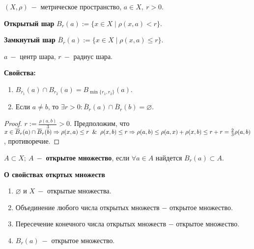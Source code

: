 \begin{definition}
    $(X,\rho)\ -$ метрическое пространство, $a\in X,\ r>0$.

    \textbf{Открытый шар} $B_r(a):=\{x\in X\mid \rho(x,a)<r\}$.

    \textbf{Замкнутый шар} $\overline{B}_r(a):=\{x\in X\mid \rho(x,a)\leq r\}$.

    $a\ -$ центр шара, $r\ -$ радиус шара.
\end{definition}

\begin{statement}
    \textbf{Свойства:}
    \begin{enumerate}
        \item $B_{r_1}(a)\cap B_{r_2}(a)=B_{\min\{r_1, r_2\}}(a)$.
        \item Если $a\neq b$, то $\exists r>0:\overline{B}_r(a)\cap \overline{B}_r(b)=\varnothing$.
    \end{enumerate}
\end{statement}

\begin{proof}
    $r:=\frac{\rho(a,b)}{3}>0.$ Предположим, что $x\in \overline{B}_r(a)\cap \overline{B}_r(b)\Rightarrow \rho(x,a)\leq r\And \rho(x,b)\leq r\Rightarrow \rho(a,b)\leq \rho(a,x)+\rho(x,b)\leq r+r=\frac{2}{3}\rho(a,b)$, противоречие.
\end{proof}

\begin{definition}
    $A\subset X;\ A\ -$ \textbf{открытое множество}, если $\forall a\in A$ найдется $B_r(a)\subset A$.
\end{definition}

\begin{theorem}
    \textbf{О свойствах откртых множеств}

    \begin{enumerate}
        \item $\varnothing$ и $X\ -$ открытые множества.

        \item Объединение любого числа открытых множеств $-$ открытое множество.

        \item Пересечение конечного числа открытых множеств $-$ открытое множество.

        \item $B_r(a)\ -$ открытое множество.
    \end{enumerate}
\end{theorem}

